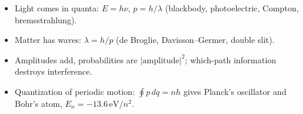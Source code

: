 \begin{fact}
\leavevmode
\begin{itemize}
\item Light comes in quanta: $E = h\nu$, $p = h/\lambda$ (blackbody, photoelectric, Compton, bremsstrahlung).
\item Matter has waves: $\lambda = h/p$ (de Broglie, Davisson--Germer, double slit).
\item Amplitudes add, probabilities are $|\text{amplitude}|^2$; which-path information destroys interference.
\item Quantization of periodic motion: $\oint p\,dq = nh$ gives Planck's oscillator and Bohr's atom, $E_n = -13.6\,\text{eV}/n^2$.
\end{itemize}
\end{fact}

